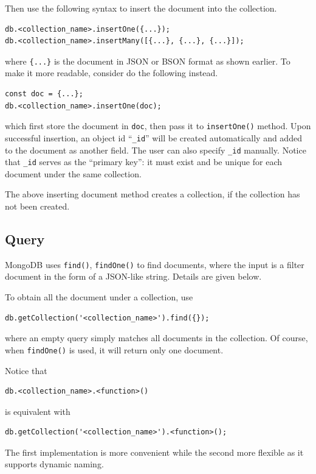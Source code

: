 Then use the following syntax to insert the document into the collection.
\begin{lstlisting}
db.<collection_name>.insertOne({...});
db.<collection_name>.insertMany([{...}, {...}, {...}]);
\end{lstlisting}
where \verb|{...}| is the document in JSON or BSON format as shown earlier. To make it more readable, consider do the following instead.
\begin{lstlisting}
const doc = {...};
db.<collection_name>.insertOne(doc);
\end{lstlisting}
which first store the document in \verb|doc|, then pass it to \verb|insertOne()| method. Upon successful insertion, an object id ``\verb|_id|'' will be created automatically and added to the document as another field. The user can also specify \verb|_id| manually. Notice that \verb|_id| serves as the ``primary key'': it must exist and be unique for each document under the same collection.

The above inserting document method creates a collection, if the collection has not been created.

\subsection{Query}

MongoDB uses \verb|find()|, \verb|findOne()| to find documents, where the input is a filter document in the form of a JSON-like string. Details are given below.

To obtain all the document under a collection, use
\begin{lstlisting}
db.getCollection('<collection_name>').find({});
\end{lstlisting}
where an empty query simply matches all documents in the collection. Of course, when \verb|findOne()| is used, it will return only one document.

\begin{shortbox}
Notice that
\begin{lstlisting}
db.<collection_name>.<function>()
\end{lstlisting}
is equivalent with
\begin{lstlisting}
db.getCollection('<collection_name>').<function>();
\end{lstlisting}
The first implementation is more convenient while the second more flexible as it supports dynamic naming.
\end{shortbox}


